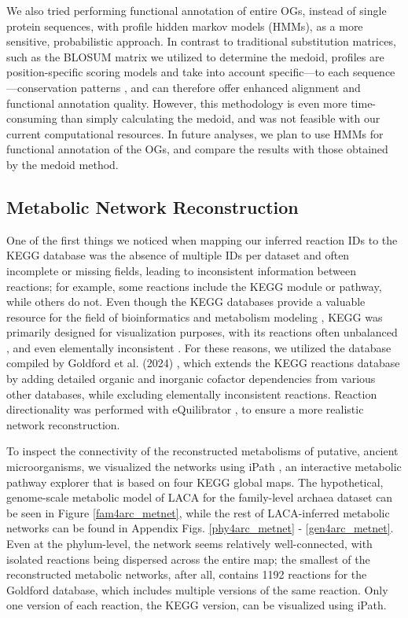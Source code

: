 We also tried performing functional annotation of entire OGs, instead of single protein sequences, with profile hidden markov models (HMMs), as a more sensitive, probabilistic approach. In contrast to traditional substitution matrices, such as the BLOSUM matrix \cite{henikoff1992} we utilized to determine the medoid, profiles are position-specific scoring models and take into account specific---to each sequence---conservation patterns \cite{mount2009, gribskov1987}, and can therefore offer enhanced alignment and functional annotation quality. However, this methodology is even more time-consuming than simply calculating the medoid, and was not feasible with our current computational resources. In future analyses, we plan to use HMMs for functional annotation of the OGs, and compare the results with those obtained by the medoid method.

\subsection*{Metabolic Network Reconstruction}


One of the first things we noticed when mapping our inferred reaction IDs to the KEGG database was the absence of multiple IDs per dataset and often incomplete or missing fields, leading to inconsistent information between reactions; for example, some reactions include the KEGG module or pathway, while others do not. Even though the KEGG databases provide a valuable resource for the field of bioinformatics and metabolism modeling \cite{kanehisa2000}, KEGG was primarily designed for visualization purposes, with its reactions often unbalanced \cite{wrzodek2013}, and even elementally inconsistent \cite{goldford2024}. For these reasons, we utilized the database compiled by Goldford et al. (2024) \cite{goldford2024}, which extends the KEGG reactions database by adding detailed organic and inorganic cofactor dependencies from various other databases, while excluding elementally inconsistent reactions. Reaction directionality was performed with eQuilibrator \cite{beber2022}, to ensure a more realistic network reconstruction.

To inspect the connectivity of the reconstructed metabolisms of putative, ancient microorganisms, we visualized the networks using iPath \cite{darzi2018}, an interactive metabolic pathway explorer that is based on four KEGG global maps. The hypothetical, genome-scale metabolic model of LACA for the family-level archaea dataset can be seen in Figure \ref{fam4arc_metnet}, while the rest of LACA-inferred metabolic networks can be found in Appendix Figs. \ref{phy4arc_metnet} - \ref{gen4arc_metnet}. Even at the phylum-level, the network seems relatively well-connected, with isolated reactions being dispersed across the entire map; the smallest of the reconstructed metabolic networks, after all, contains 1192 reactions for the Goldford database, which includes multiple versions of the same reaction. Only one version of each reaction, the KEGG version, can be visualized using iPath. 

